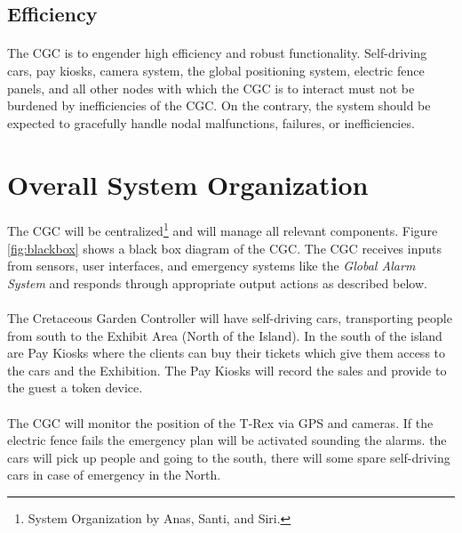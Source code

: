 \documentclass[12pt]{article}
\begin{document}
	\subsection{Efficiency}\label{eff}
	\paragraph{} The CGC is to engender high efficiency and robust functionality. 
	Self-driving cars, pay kiosks, camera system, the global positioning system, 
	electric fence panels, and all other nodes with which the CGC is to interact 
	must not be burdened by inefficiencies of the CGC. On the contrary, the system
	should be expected to gracefully handle nodal malfunctions, failures, or
	inefficiencies.




\section{Overall System Organization} 
\label{sys}
\paragraph{} The CGC will be centralized\footnote{System Organization 
by Anas, Santi, and Siri.} and will manage all relevant components. Figure 
\ref{fig:blackbox} shows a black box diagram of the CGC. The CGC receives inputs 
from sensors, user interfaces, and emergency systems like the \textit{Global 
Alarm System} and responds through appropriate output actions as described 
below.

\paragraph{} The Cretaceous Garden Controller will have self-driving cars, 
transporting people from south to the Exhibit Area (North of the Island). In 
the south of the island are Pay Kiosks where the clients can buy their tickets which
give them access to the cars and the Exhibition. The Pay Kiosks will record the sales 
and provide to the guest a token device.

\paragraph{} The CGC will monitor the position of the T-Rex via GPS and
cameras. If the electric fence fails the emergency plan will be activated 
sounding the alarms. the cars will pick up people and going to the south,
there will some spare self-driving cars in case of emergency in the 
North.
\end{document}

